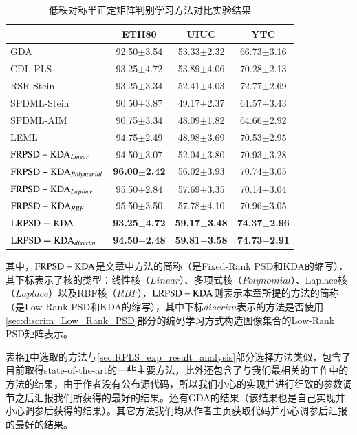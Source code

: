 \begin{table}[htb]
	\centering
	\caption{低秩对称半正定矩阵判别学习方法对比实验结果}
	\begin{tabular*}{\linewidth}{@{\extracolsep{\fill}}|l|ccc|}\hline
		\diagbox{方法}{数据集} &ETH80 &UIUC &YTC \\ \hline
		GDA\cite{Subspace_GDA} &92.50$\pm$3.54	&53.33$\pm$2.32 &66.73$\pm$3.16 \\ \hline
		CDL-PLS\cite{Statistics_CDL} &93.25$\pm$4.72 &53.89$\pm$4.06 &70.28$\pm$2.13 \\ \hline
		RSR-Stein\cite{Dictionary_RSR} &93.25$\pm$3.34 &52.41$\pm$4.03 &72.77$\pm$2.69  \\ \hline
		SPDML-Stein\cite{Statistics_SPDML} &90.50$\pm$3.87 &49.17$\pm$2.37 &61.57$\pm$3.43  \\ \hline
		SPDML-AIM\cite{Statistics_SPDML} &90.75$\pm$3.34 &48.09$\pm$1.82 &64.66$\pm$2.92  \\ \hline
		LEML\cite{Statistics_LEML}&94.75$\pm$2.49 &48.98$\pm$3.69 &70.53$\pm$2.95  \\ \hline
		${\rm FRPSD-KDA}_{Linear}$\cite{PSD_WACV}&94.50$\pm$3.07	&52.04$\pm$3.80	&70.93$\pm$3.28  \\ \hline
		${\rm FRPSD-KDA}_{Polynomial}$\cite{PSD_WACV}&\textbf{96.00$\pm$2.42}	&56.02$\pm$3.93 &70.74$\pm$3.05  \\ \hline
		${\rm FRPSD-KDA}_{Laplace}$\cite{PSD_WACV}&95.50$\pm$2.84 &57.69$\pm$3.35 &70.14$\pm$3.04  \\ \hline
		${\rm FRPSD-KDA}_{RBF}$\cite{PSD_WACV}&95.50$\pm$3.50 &57.78$\pm$4.10 &70.96$\pm$3.05\\ \hline
		${\rm \bm{LRPSD-KDA}}$ &\textbf{93.25$\pm$4.72} &\textbf{59.17$\pm$3.48} &\textbf{74.37$\pm$2.96}  \\ \hline
		${\rm \bm{LRPSD-KDA}}_{discrim}$ &\textbf{94.50$\pm$2.48} &\textbf{59.81$\pm$3.58} &\textbf{74.73$\pm$2.91}  \\ \hline
	\end{tabular*}
	\label{tab:LRPSD_experiment}
\end{table}
其中，${\rm FRPSD-KDA}$是文章\cite{PSD_WACV}中方法的简称（是Fixed-Rank PSD和KDA的缩写），其下标表示了核的类型：线性核（$Linear$）、多项式核（$Polynomial$）、Laplace核（$Laplace$）以及RBF核（$RBF$），${\rm LRPSD-KDA}$则表示本章所提的方法的简称（是Low-Rank PSD和KDA的缩写），其中下标$discrim$表示的方法是否使用\ref{sec:discrim_Low_Rank_PSD}部分的编码学习方式构造图像集合的Low-Rank PSD矩阵表示。

表格\ref{tab:LRPSD_experiment}中选取的方法与\ref{sec:RPLS_exp_result_analysis}部分选择方法类似，包含了目前取得state-of-the-art的一些主要方法，此外还包含了与我们最相关的工作\cite{PSD_WACV}中的方法的结果，由于作者没有公布源代码，所以我们小心的实现并进行细致的参数调节之后汇报我们所获得的最好的结果。还有GDA\cite{Subspace_GDA}的结果（该结果也是自己实现并小心调参后获得的结果）。其它方法我们均从作者主页获取代码并小心调参后汇报的最好的结果。

